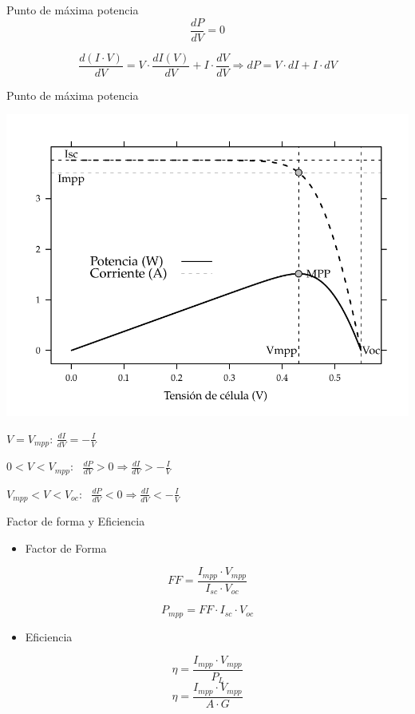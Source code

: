 \documentclass[xcolor={usenames,svgnames,dvipsnames}]{beamer}
\begin{document}
\begin{frame}[label={sec:orgde9116c}]{Punto de máxima potencia}
$$\frac{dP}{dV}=0$$

$$\frac{d(I\cdot
  V)}{dV}=V\cdot\frac{dI(V)}{dV}+I\cdot\frac{dV}{dV}\Rightarrow
dP=V\cdot dI+I\cdot dV$$
\end{frame}



\begin{frame}[label={sec:org9595ae6}]{Punto de máxima potencia}
\begin{center}
\includegraphics[width=.9\linewidth]{../figs/CurvaIV_Ta20_G800.pdf}
\end{center}

\(V=V_{mpp}:\,\frac{dI}{dV}=-\frac{I}{V}\)

\(0<V<V_{mpp}\):  \(\frac{dP}{dV}>0\Rightarrow\frac{dI}{dV}>-\frac{I}{V}\)

\(V_{mpp}<V<V_{oc}\): 
\(\frac{dP}{dV}<0\Rightarrow\frac{dI}{dV}<-\frac{I}{V}\)
\end{frame}

\begin{frame}[label={sec:org9279dab}]{Factor de forma y Eficiencia}
\begin{itemize}
\item Factor de Forma
\end{itemize}
$$FF=\frac{I_{mpp}\cdot V_{mpp}}{I_{sc}\cdot V_{oc}}$$

$$P_{mpp}=FF\cdot I_{sc}\cdot V_{oc}$$

\begin{itemize}
\item Eficiencia
\end{itemize}

$$\eta = \frac{I_{mpp}\cdot V_{mpp}}{P_{L}}$$
$$\eta = \frac{I_{mpp}\cdot V_{mpp}}{A \cdot G}$$
\end{frame}
\end{document}
